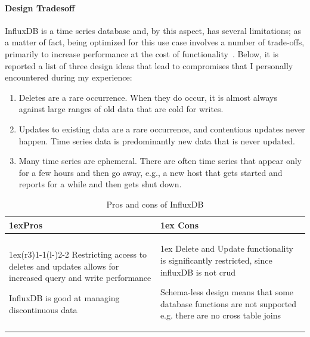 \paragraph{Design Tradesoff}
InfluxDB is a time series database and, by this aspect, has several limitations; as a matter of fact,
being optimized for this use case involves a number of trade-offs, primarily to increase performance at the cost of functionality~\cite{Misc:influx_docs}.
Below, it is reported a list of three design ideas that lead to compromises that I personally encountered during my experience:
\begin{enumerate}
    \item Deletes are a rare occurrence. When they do occur, it is almost always against large ranges of old data that are cold for writes.
    \item Updates to existing data are a rare occurrence, and contentious updates never happen. Time series data is predominantly new data that is never updated.
    \item Many time series are ephemeral. There are often time series that appear only for a few hours and then go away, e.g., a new host that gets started and reports for a while and then gets shut down.
\end{enumerate}
\begin{table}[ht]
    \begin{tabularx}{\textwidth}{>{\parskip1ex}X@{\kern4\tabcolsep}>{\parskip1ex}X}
        \toprule
        \hfil\bfseries Pros
        &
        \hfil\bfseries Cons
        \\\cmidrule(r{3\tabcolsep}){1-1}\cmidrule(l{-\tabcolsep}){2-2}
        Restricting access to deletes and updates allows for increased query and write performance\par
        InfluxDB is good at managing discontinuous data\par
        &
        Delete and Update functionality is significantly restricted, since influxDB is not \acs{crud} \par
        Schema-less design means that some database functions are not supported e.g. there are no cross table joins\par
        \\\bottomrule
    \end{tabularx}
    \caption{Pros and cons of InfluxDB}
\end{table}

